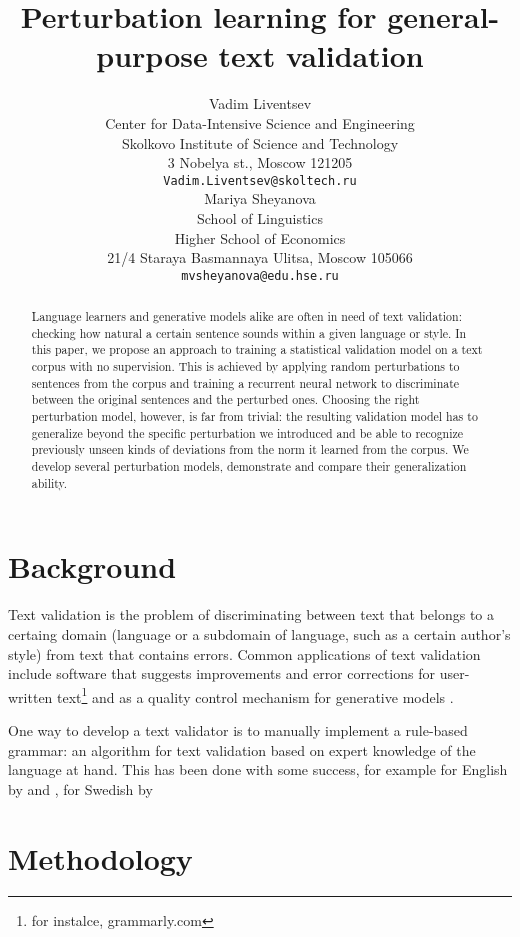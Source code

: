 \documentclass[11pt,a4paper]{article}
\title{Perturbation learning for general-purpose text validation}
\author{Vadim Liventsev \\
  Center for Data-Intensive Science and Engineering \\
  Skolkovo Institute of Science and Technology\\
  3 Nobelya st., Moscow 121205 \\
  {\tt Vadim.Liventsev@skoltech.ru} \\\And
  Mariya Sheyanova \\
  School of Linguistics \\
  Higher School of Economics \\
  21/4 Staraya Basmannaya Ulitsa, Moscow 105066 \\
  {\tt mvsheyanova@edu.hse.ru} \\}
\date{}
\begin{document}
\maketitle
\begin{abstract}
  Language learners and generative models alike are often in need of text validation: checking how natural a certain sentence sounds within a given language or style.
  In this paper, we propose an approach to training a statistical validation model on a text corpus with no supervision.
  This is achieved by applying random perturbations to sentences from the corpus and training a recurrent neural network to discriminate between the original sentences and the perturbed ones.
  Choosing the right perturbation model, however, is far from trivial: the resulting validation model has to generalize beyond the specific perturbation we introduced and be able to recognize previously unseen kinds of deviations from the norm it learned from the corpus.
  We develop several perturbation models, demonstrate and compare their generalization ability.
\end{abstract}

\section{Background}
\label{sec:background}

Text validation is the problem of discriminating between text that belongs to a certaing domain (language or a subdomain of language, such as a certain author's style) from text that contains errors. 
Common applications of text validation include software that suggests improvements and error corrections for user-written text\footnote{for instalce, grammarly.com} and as a quality control mechanism for generative models \cite{eval-genmodels}.

One way to develop a text validator is to manually implement a rule-based grammar: an algorithm for text validation based on expert knowledge of the language at hand. 
This has been done with some success, for example for English by \citet{easyenglish} and \citet{english-checker}, for Swedish by \citet{swedish-checker} %




\section{Methodology}
\label{sec:methodology}
\end{document}
